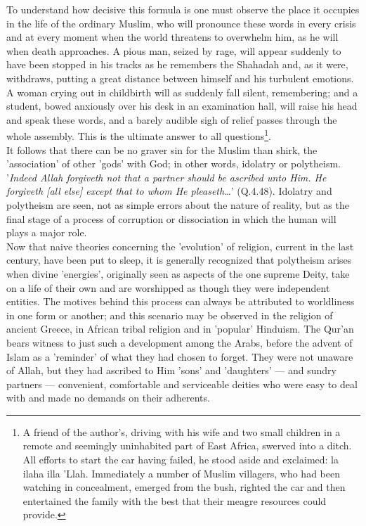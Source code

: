 \documentclass[10pt, twoside,openright]{book}
\begin{document}
To understand how decisive this formula is one must observe the place it occupies in the life of the 
ordinary Muslim, who will pronounce these words in every crisis and at every moment when the world 
threatens to overwhelm him, as he will when death approaches. A pious man, seized by rage, will 
appear suddenly to have been stopped in his tracks as he remembers the Shahadah and, as it were, 
withdraws, putting a great distance between himself and his turbulent emotions. A woman crying out in 
childbirth will as suddenly fall silent, remembering; and a student, bowed anxiously over his desk in 
an examination hall, will raise his head and speak these words, and a barely audible sigh of relief 
passes through the whole assembly. This is the ultimate answer to all questions\footnote{A friend of the author's, driving with his wife and two small children in a remote and seemingly uninhabited part of East Africa, swerved into a ditch. All efforts to start the car having failed, he stood aside and exclaimed: la ilaha illa 'Llah. Immediately a number of Muslim villagers, who had been watching in concealment, emerged from the bush, righted the car and then entertained the family with the best that their meagre resources could provide.}. \\

It follows that there can be no graver sin for the Muslim than shirk, the 'association' of other 
'gods' with God; in other words, idolatry or polytheism. '\emph{Indeed Allah forgiveth not that a partner 
should be ascribed unto Him. He forgiveth [all else] except that to whom He pleaseth\ldots{}}' (Q.4.48). 
Idolatry and polytheism are seen, not as simple errors about the nature of reality, but as the final 
stage of a process of corruption or dissociation in which the human will plays a major role. \\

Now that naive theories concerning the 'evolution' of religion, current in the last century, have 
been put to sleep, it is generally recognized that polytheism arises when divine 'energies', 
originally seen as aspects of the one supreme Deity, take on a life of their own and are worshipped 
as though they were independent entities. The motives behind this process can always be attributed to 
worldliness in one form or another; and this scenario may be observed in the religion of ancient 
Greece, in African tribal religion and in 'popular' Hinduism. The Qur'an bears witness to just such a 
development among the Arabs, before the advent of Islam as a 'reminder' of what they had chosen to 
forget. They were not unaware of Allah, but they had ascribed to Him 'sons' and 'daughters' --- and 
sundry partners --- convenient, comfortable and serviceable deities who were easy to deal with and made 
no demands on their adherents. \\
\end{document}
